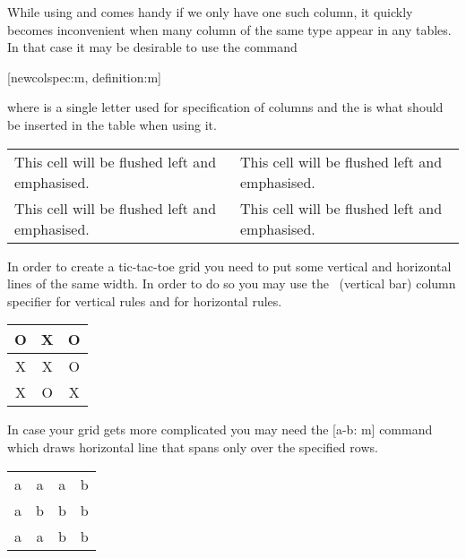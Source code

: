 While using  and  comes handy if we only have
one such column, it quickly becomes inconvenient when many column of the same
type appear in any tables. In that case it may be desirable to use the command
\begin{lscommand}
  [newcolspec:m, definition:m]
\end{lscommand}
where  is a single letter used for specification of columns
and the  is what should be inserted in the table when using
it.
\begin{example}
\begin{tabular}{ee}
  This cell will
    be flushed left
    and emphasised. &
  This cell will
    be flushed left
    and emphasised.
  \tabularnewline

  This cell will
    be flushed left
    and emphasised. &
  This cell will
    be flushed left
    and emphasised.
  \tabularnewline
\end{tabular}
\end{example}

In order to create a tic-tac-toe grid you need to put some vertical and
horizontal lines of the same width. In order to do so you may use the
\cargv{|}~(vertical bar) column specifier for vertical rules and  for
horizontal rules.
\begin{chktexignore}
  \begin{example}
\begin{tabular}{c|c|c}
  O & X & O \\
  \hline
  X & X & O \\
  \hline
  X & O & X \\
\end{tabular}
\end{example}
\end{chktexignore}
In case your grid gets more complicated you may need the [a-b: m] %
command which draws horizontal line that spans only over the specified rows.
\begin{chktexignore}
  \begin{example}[examplewidth=0.35\linewidth]
\begin{tabular}{|cccc|}
  \cline{4-4}
  a & a & \multicolumn{1}{c|}{a} & b \\
  \cline{2-3}
  a & \multicolumn{1}{|c}{b} & b & b \\
  \cline{2-2}
  a & a & \multicolumn{1}{|c}{b} & b \\
  \cline{1-2}
\end{tabular}
\end{example}
\end{chktexignore}

